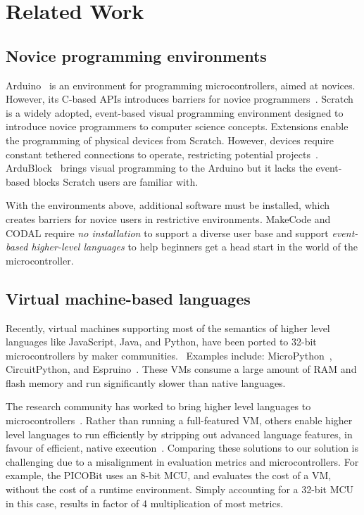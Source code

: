 \section{Related Work}
\label{sec:related}
\subsection{Novice programming environments}

Arduino~\cite{buildingArduino2014} is an environment for programming microcontrollers, aimed at novices. However, its C-based APIs introduces barriers for novice programmers~\cite{blikstein2013gears}. Scratch~\cite{ScratchCACM2009} is a widely adopted, event-based visual programming environment designed to introduce novice programmers to computer science concepts. Extensions enable the programming of physical devices from Scratch. However, devices require constant tethered connections to operate, restricting potential projects~\cite{dougherty2012maker}. ArduBlock~\cite{Ardubloc28:online} brings visual programming to the Arduino but it lacks the event-based blocks Scratch users are familiar with.

With the environments above, additional software must be installed, which creates barriers for novice users in restrictive environments. MakeCode and CODAL require \emph{no installation} to support a diverse user base and support \emph{event-based higher-level languages} to help beginners get a head start in the world of the microcontroller.

\subsection{Virtual machine-based languages}

Recently, virtual machines supporting most of the semantics of higher level languages like JavaScript, Java, and Python, have been ported to 32-bit microcontrollers by maker communities.~\cite{dougherty2012maker} Examples include: MicroPython~\cite{MicroPython}, CircuitPython, and Espruino~\cite{espruinoBook}. These VMs consume a large amount of RAM and flash memory and run significantly slower than native languages.

The research community has worked to bring higher level languages to microcontrollers~\cite{koshy2005vmstar,st2009picobit,vaugon2015programming}. Rather than running a full-featured VM, others enable higher level languages to run efficiently by stripping out advanced language features, in favour of efficient, native execution~\cite{varma2004java}. Comparing these solutions to our solution is challenging due to a misalignment in evaluation metrics and microcontrollers. For example, the PICOBit uses an 8-bit MCU, and evaluates the cost of a VM, without the cost of a runtime environment. Simply accounting for a 32-bit MCU in this case, results in factor of 4 multiplication of most metrics.

